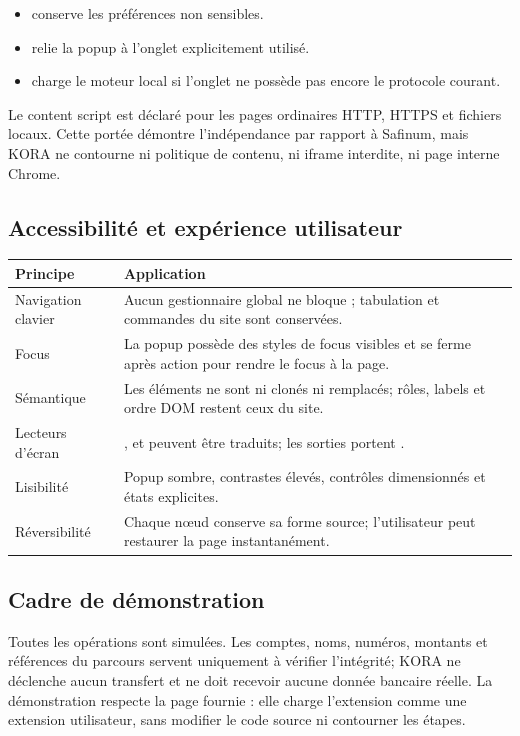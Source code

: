 \begin{itemize}
  \item {} conserve les préférences non sensibles.
  \item {} relie la popup à l’onglet explicitement utilisé.
  \item {} charge le moteur local si l’onglet ne possède pas
        encore le protocole courant.
\end{itemize}

Le content script est déclaré pour les pages ordinaires HTTP, HTTPS et fichiers
locaux. Cette portée démontre l’indépendance par rapport à Safinum, mais KORA
ne contourne ni politique de contenu, ni iframe interdite, ni page interne
Chrome.

\subsection{Accessibilité et expérience utilisateur}

\begin{tabularx}{\linewidth}{@{}|L{43mm}|Y|@{}}
\hline
\textbf{Principe} & \textbf{Application}\\
\hline
Navigation clavier &
Aucun gestionnaire global ne bloque ; tabulation et commandes du
site sont conservées.\\
\hline
Focus &
La popup possède des styles de focus visibles et se ferme après action pour
rendre le focus à la page.\\
\hline
Sémantique &
Les éléments ne sont ni clonés ni remplacés; rôles, labels et ordre DOM
restent ceux du site.\\
\hline
Lecteurs d’écran &
,  et  peuvent être traduits;
les sorties portent .\\
\hline
Lisibilité &
Popup sombre, contrastes élevés, contrôles dimensionnés et états explicites.\\
\hline
Réversibilité &
Chaque nœud conserve sa forme source; l’utilisateur peut restaurer la page
instantanément.\\
\hline
\end{tabularx}

\subsection{Cadre de démonstration}

Toutes les opérations sont simulées. Les comptes, noms, numéros, montants et
références du parcours servent uniquement à vérifier l’intégrité; KORA ne
déclenche aucun transfert et ne doit recevoir aucune donnée bancaire réelle.
La démonstration respecte la page fournie : elle charge l’extension comme une
extension utilisateur, sans modifier le code source ni contourner les étapes.

